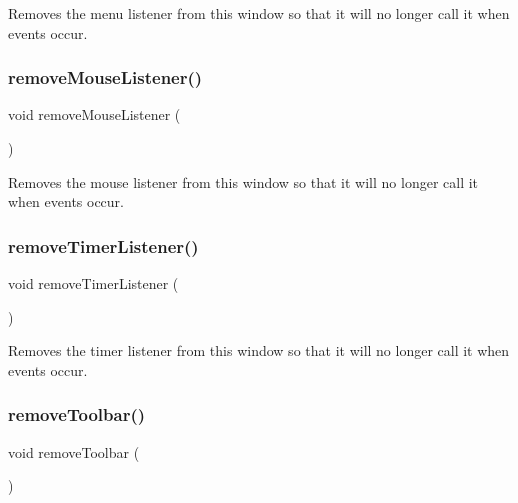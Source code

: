 Removes the menu listener from this window so that it will no longer call it when events occur. 

\mbox{\label{classGWindow_aff47f71ce47e688a07c9d38dc92fcc11}} 
\subsubsection{\texorpdfstring{remove\+Mouse\+Listener()}{removeMouseListener()}}
{\footnotesize\ttfamily void remove\+Mouse\+Listener (\begin{DoxyParamCaption}{ }\end{DoxyParamCaption})\hspace{0.3cm}{\ttfamily [virtual]}}



Removes the mouse listener from this window so that it will no longer call it when events occur. 

\mbox{\label{classGWindow_a8ca9bf0f8dfd3755d73d07ee01e3455f}} 
\subsubsection{\texorpdfstring{remove\+Timer\+Listener()}{removeTimerListener()}}
{\footnotesize\ttfamily void remove\+Timer\+Listener (\begin{DoxyParamCaption}{ }\end{DoxyParamCaption})\hspace{0.3cm}{\ttfamily [virtual]}}



Removes the timer listener from this window so that it will no longer call it when events occur. 

\mbox{\label{classGWindow_a3d1c6ae17962b89115a4bf1c2f6142eb}} 
\subsubsection{\texorpdfstring{remove\+Toolbar()}{removeToolbar()}}
{\footnotesize\ttfamily void remove\+Toolbar (\begin{DoxyParamCaption}{ }\end{DoxyParamCaption})\hspace{0.3cm}{\ttfamily [virtual]}}



